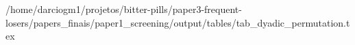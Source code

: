 /home/darciogm1/projetos/bitter-pills/paper3-frequent-losers/papers_finais/paper1_screening/output/tables/tab_dyadic_permutation.tex